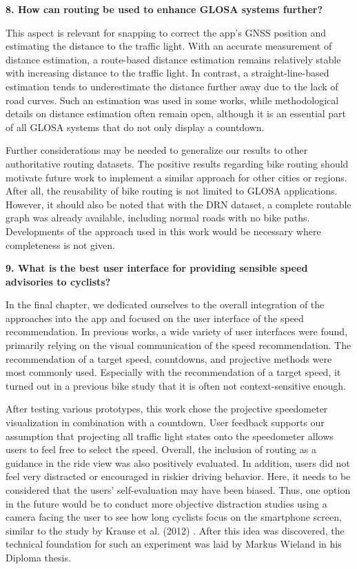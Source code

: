 \textbf{\color{cidarkblue}8. How can routing be used to enhance GLOSA systems further?}

This aspect is relevant for snapping to correct the app's GNSS position and estimating the distance to the traffic light. With an accurate measurement of distance estimation, a route-based distance estimation remains relatively stable with increasing distance to the traffic light. In contrast, a straight-line-based estimation tends to underestimate the distance further away due to the lack of road curves. Such an estimation was used in some works, while methodological details on distance estimation often remain open, although it is an essential part of all GLOSA systems that do not only display a countdown.

Further considerations may be needed to generalize our results to other authoritative routing datasets. The positive results regarding bike routing should motivate future work to implement a similar approach for other cities or regions. After all, the reusability of bike routing is not limited to GLOSA applications. However, it should also be noted that with the DRN dataset, a complete routable graph was already available, including normal roads with no bike paths. Developments of the approach used in this work would be necessary where completeness is not given.

\textbf{\color{cidarkblue}9. What is the best user interface for providing sensible speed advisories to cyclists?} 

In the final chapter, we dedicated ourselves to the overall integration of the approaches into the app and focused on the user interface of the speed recommendation. In previous works, a wide variety of user interfaces were found, primarily relying on the visual communication of the speed recommendation. The recommendation of a target speed, countdowns, and projective methods were most commonly used. Especially with the recommendation of a target speed, it turned out in a previous bike study that it is often not context-sensitive enough. 

After testing various prototypes, this work chose the projective speedometer visualization in combination with a countdown. User feedback supports our assumption that projecting all traffic light states onto the speedometer allows users to feel free to select the speed. Overall, the inclusion of routing as a guidance in the ride view was also positively evaluated. In addition, users did not feel very distracted or encouraged in riskier driving behavior. Here, it needs to be considered that the users' self-evaluation may have been biased. Thus, one option in the future would be to conduct more objective distraction studies using a camera facing the user to see how long cyclists focus on the smartphone screen, similar to the study by Krause et al. (2012) \cite{krause_traffic_2012}. After this idea was discovered, the technical foundation for such an experiment was laid by Markus Wieland \cite{wieland_2023} in his Diploma thesis.

